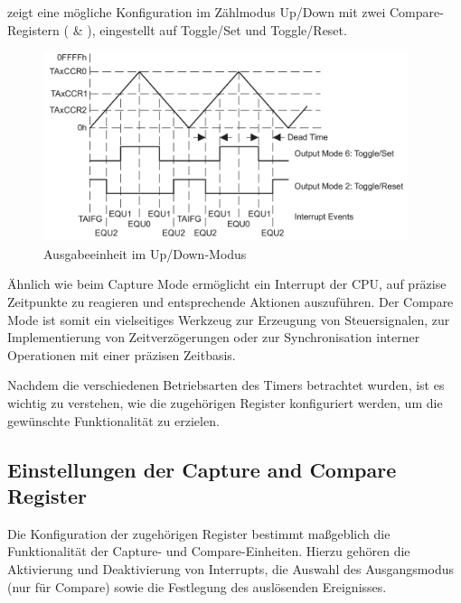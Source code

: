  zeigt eine m\"ogliche Konfiguration im Z\"ahlmodus Up/Down mit zwei Compare-Registern ( \& ), eingestellt auf Toggle/Set und Toggle/Reset.

\begin{figure}[h!]
	\centering
	\includegraphics[width=0.95\textwidth]{../Bilder/UpDown_ModeBsp.png}
	\caption{Ausgabeeinheit im Up/Down-Modus\\}
	\label{fig:OutputUnit_UpDown_Mode}
\end{figure}

\newpage
\"Ahnlich wie beim Capture Mode erm\"oglicht ein Interrupt der CPU, auf pr\"azise Zeitpunkte zu reagieren und entsprechende Aktionen auszuf\"uhren. Der Compare Mode ist somit ein vielseitiges Werkzeug zur Erzeugung von Steuersignalen, zur Implementierung von Zeitverz\"ogerungen oder zur Synchronisation interner Operationen mit einer pr\"azisen Zeitbasis. 

Nachdem die verschiedenen Betriebsarten des Timers betrachtet wurden, ist es wichtig zu verstehen, wie die zugeh\"origen Register konfiguriert werden, um die gew\"unschte Funktionalit\"at zu erzielen.

\subsection{Einstellungen der Capture and Compare Register}
\label{sec:CC_Register}

Die Konfiguration der zugeh\"origen Register bestimmt ma{\ss}geblich die Funktionalit\"at der Capture- und Compare-Einheiten. Hierzu geh\"oren die Aktivierung und Deaktivierung von Interrupts, die Auswahl des Ausgangsmodus (nur f\"ur Compare) sowie die Festlegung des ausl\"osenden Ereignisses.

